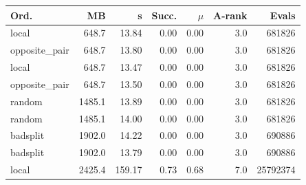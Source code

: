 \scriptsize
\setlength{\tabcolsep}{2.4pt}
\begin{tabular}{@{}lrrrrrr@{}}
\toprule
Ord. & MB & s & Succ. & $\mu$ & A-rank & Evals \\
\midrule
local & 648.7 & 13.84 & 0.00 & 0.00 & 3.0 & 681826 \\
opposite\_pair & 648.7 & 13.80 & 0.00 & 0.00 & 3.0 & 681826 \\
local & 648.7 & 13.47 & 0.00 & 0.00 & 3.0 & 681826 \\
opposite\_pair & 648.7 & 13.50 & 0.00 & 0.00 & 3.0 & 681826 \\
random & 1485.1 & 13.89 & 0.00 & 0.00 & 3.0 & 681826 \\
random & 1485.1 & 14.00 & 0.00 & 0.00 & 3.0 & 681826 \\
badsplit & 1902.0 & 14.22 & 0.00 & 0.00 & 3.0 & 690886 \\
badsplit & 1902.0 & 13.79 & 0.00 & 0.00 & 3.0 & 690886 \\
local & 2425.4 & 159.17 & 0.73 & 0.68 & 7.0 & 25792374 \\
\bottomrule
\end{tabular}
\normalsize
